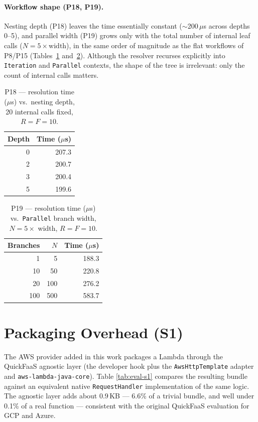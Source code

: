 \paragraph{Workflow shape (P18, P19).}
Nesting depth (P18) leaves the time essentially constant ($\sim$200\,$\mu$s across depths 0--5),
and parallel width (P19) grows only with the total number of internal leaf calls
($N = 5\times\text{width}$), in the same order of magnitude as the flat workflows of P8/P15
(Tables~\ref{tab:eval-p18} and~\ref{tab:eval-p19}). Although the resolver recurses explicitly into
\texttt{Iteration} and \texttt{Parallel} contexts, the shape of the tree is irrelevant: only the
count of internal calls matters.

\begin{table}[htbp]
  \centering
  \caption{P18 --- resolution time ($\mu$s) vs.\ nesting depth, 20 internal calls fixed,
  $R{=}F{=}10$.}
  \label{tab:eval-p18}
  \begin{tabular}{rr}
    \hline
    \textbf{Depth} & \textbf{Time ($\mu$s)} \\
    \hline
    0 & 207.3 \\
    2 & 200.7 \\
    3 & 200.4 \\
    5 & 199.6 \\
    \hline
  \end{tabular}
\end{table}

\begin{table}[htbp]
  \centering
  \caption{P19 --- resolution time ($\mu$s) vs.\ \texttt{Parallel} branch width,
  $N = 5\times$ width, $R{=}F{=}10$.}
  \label{tab:eval-p19}
  \begin{tabular}{rrr}
    \hline
    \textbf{Branches} & \textbf{$N$} & \textbf{Time ($\mu$s)} \\
    \hline
    1   & 5   & 188.3 \\
    10  & 50  & 220.8 \\
    20  & 100 & 276.2 \\
    100 & 500 & 583.7 \\
    \hline
  \end{tabular}
\end{table}

\section{Packaging Overhead (S1)}
\label{sec:eval-bundle}

The AWS provider added in this work packages a Lambda through the QuickFaaS agnostic layer (the
developer hook plus the \texttt{AwsHttpTemplate} adapter and \texttt{aws-lambda-java-core}). Table
\ref{tab:eval-s1} compares the resulting bundle against an equivalent native \texttt{RequestHandler}
implementation of the same logic. The agnostic layer adds about $0.9$\,KB --- 6.6\% of a trivial
bundle, and well under 0.1\% of a real function --- consistent with the original QuickFaaS
evaluation for GCP and Azure.

